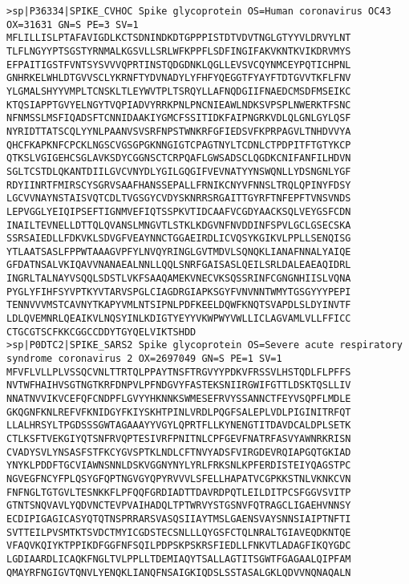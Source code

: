 \begin{lstlisting}
>sp|P36334|SPIKE_CVHOC Spike glycoprotein OS=Human coronavirus OC43 OX=31631 GN=S PE=3 SV=1
MFLILLISLPTAFAVIGDLKCTSDNINDKDTGPPPISTDTVDVTNGLGTYYVLDRVYLNT
TLFLNGYYPTSGSTYRNMALKGSVLLSRLWFKPPFLSDFINGIFAKVKNTKVIKDRVMYS
EFPAITIGSTFVNTSYSVVVQPRTINSTQDGDNKLQGLLEVSVCQYNMCEYPQTICHPNL
GNHRKELWHLDTGVVSCLYKRNFTYDVNADYLYFHFYQEGGTFYAYFTDTGVVTKFLFNV
YLGMALSHYYVMPLTCNSKLTLEYWVTPLTSRQYLLAFNQDGIIFNAEDCMSDFMSEIKC
KTQSIAPPTGVYELNGYTVQPIADVYRRKPNLPNCNIEAWLNDKSVPSPLNWERKTFSNC
NFNMSSLMSFIQADSFTCNNIDAAKIYGMCFSSITIDKFAIPNGRKVDLQLGNLGYLQSF
NYRIDTTATSCQLYYNLPAANVSVSRFNPSTWNKRFGFIEDSVFKPRPAGVLTNHDVVYA
QHCFKAPKNFCPCKLNGSCVGSGPGKNNGIGTCPAGTNYLTCDNLCTPDPITFTGTYKCP
QTKSLVGIGEHCSGLAVKSDYCGGNSCTCRPQAFLGWSADSCLQGDKCNIFANFILHDVN
SGLTCSTDLQKANTDIILGVCVNYDLYGILGQGIFVEVNATYYNSWQNLLYDSNGNLYGF
RDYIINRTFMIRSCYSGRVSAAFHANSSEPALLFRNIKCNYVFNNSLTRQLQPINYFDSY
LGCVVNAYNSTAISVQTCDLTVGSGYCVDYSKNRRSRGAITTGYRFTNFEPFTVNSVNDS
LEPVGGLYEIQIPSEFTIGNMVEFIQTSSPKVTIDCAAFVCGDYAACKSQLVEYGSFCDN
INAILTEVNELLDTTQLQVANSLMNGVTLSTKLKDGVNFNVDDINFSPVLGCLGSECSKA
SSRSAIEDLLFDKVKLSDVGFVEAYNNCTGGAEIRDLICVQSYKGIKVLPPLLSENQISG
YTLAATSASLFPPWTAAAGVPFYLNVQYRINGLGVTMDVLSQNQKLIANAFNNALYAIQE
GFDATNSALVKIQAVVNANAEALNNLLQQLSNRFGAISASLQEILSRLDALEAEAQIDRL
INGRLTALNAYVSQQLSDSTLVKFSAAQAMEKVNECVKSQSSRINFCGNGNHIISLVQNA
PYGLYFIHFSYVPTKYVTARVSPGLCIAGDRGIAPKSGYFVNVNNTWMYTGSGYYYPEPI
TENNVVVMSTCAVNYTKAPYVMLNTSIPNLPDFKEELDQWFKNQTSVAPDLSLDYINVTF
LDLQVEMNRLQEAIKVLNQSYINLKDIGTYEYYVKWPWYVWLLICLAGVAMLVLLFFICC
CTGCGTSCFKKCGGCCDDYTGYQELVIKTSHDD
>sp|P0DTC2|SPIKE_SARS2 Spike glycoprotein OS=Severe acute respiratory syndrome coronavirus 2 OX=2697049 GN=S PE=1 SV=1
MFVFLVLLPLVSSQCVNLTTRTQLPPAYTNSFTRGVYYPDKVFRSSVLHSTQDLFLPFFS
NVTWFHAIHVSGTNGTKRFDNPVLPFNDGVYFASTEKSNIIRGWIFGTTLDSKTQSLLIV
NNATNVVIKVCEFQFCNDPFLGVYYHKNNKSWMESEFRVYSSANNCTFEYVSQPFLMDLE
GKQGNFKNLREFVFKNIDGYFKIYSKHTPINLVRDLPQGFSALEPLVDLPIGINITRFQT
LLALHRSYLTPGDSSSGWTAGAAAYYVGYLQPRTFLLKYNENGTITDAVDCALDPLSETK
CTLKSFTVEKGIYQTSNFRVQPTESIVRFPNITNLCPFGEVFNATRFASVYAWNRKRISN
CVADYSVLYNSASFSTFKCYGVSPTKLNDLCFTNVYADSFVIRGDEVRQIAPGQTGKIAD
YNYKLPDDFTGCVIAWNSNNLDSKVGGNYNYLYRLFRKSNLKPFERDISTEIYQAGSTPC
NGVEGFNCYFPLQSYGFQPTNGVGYQPYRVVVLSFELLHAPATVCGPKKSTNLVKNKCVN
FNFNGLTGTGVLTESNKKFLPFQQFGRDIADTTDAVRDPQTLEILDITPCSFGGVSVITP
GTNTSNQVAVLYQDVNCTEVPVAIHADQLTPTWRVYSTGSNVFQTRAGCLIGAEHVNNSY
ECDIPIGAGICASYQTQTNSPRRARSVASQSIIAYTMSLGAENSVAYSNNSIAIPTNFTI
SVTTEILPVSMTKTSVDCTMYICGDSTECSNLLLQYGSFCTQLNRALTGIAVEQDKNTQE
VFAQVKQIYKTPPIKDFGGFNFSQILPDPSKPSKRSFIEDLLFNKVTLADAGFIKQYGDC
LGDIAARDLICAQKFNGLTVLPPLLTDEMIAQYTSALLAGTITSGWTFGAGAALQIPFAM
QMAYRFNGIGVTQNVLYENQKLIANQFNSAIGKIQDSLSSTASALGKLQDVVNQNAQALN

\end{lstlisting}
